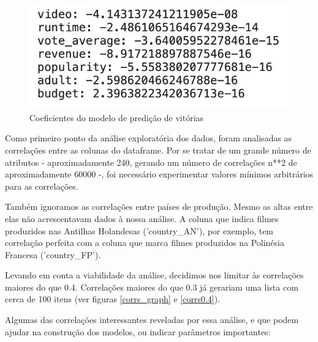             \begin{figure}[htb]
            	\caption{\label{coefs_2}Coeficientes do modelo de predição de vitórias}
            	\begin{center}
            		\includegraphics[scale=0.7]{coefs_2.png}
            	\end{center}
            \end{figure}

            Como primeiro ponto da análise exploratória dos dados, foram analisadas as correlações entre as colunas do dataframe. Por se tratar de um grande número de atributos - aproximadamente 240, gerando um número de correlações n**2 de aproximadamente 60000 -, foi necessário experimentar valores mínimos arbitrários para as correlações.

            Também ignoramos as correlações entre países de produção. Mesmo as altas entre elas não acrescentavam dados à nossa análise. A coluna que indica filmes produzidos nas Antilhas Holandesas ('country\_AN'), por exemplo, tem correlação perfeita com a coluna que marca filmes produzidos na Polinésia Francesa ('country\_FP').\par

            Levando em conta a viabilidade da análise, decidimos nos limitar às correlações maiores do que 0.4. Correlações maiores do que 0.3 já gerariam uma lista com cerca de 100 itens (ver figuras \ref{corrs_graph} e \ref{corrs0.4}). \par

            Algumas das correlações interessantes reveladas por essa análise, e que podem ajudar na construção dos modelos, ou indicar parâmetros importantes:

